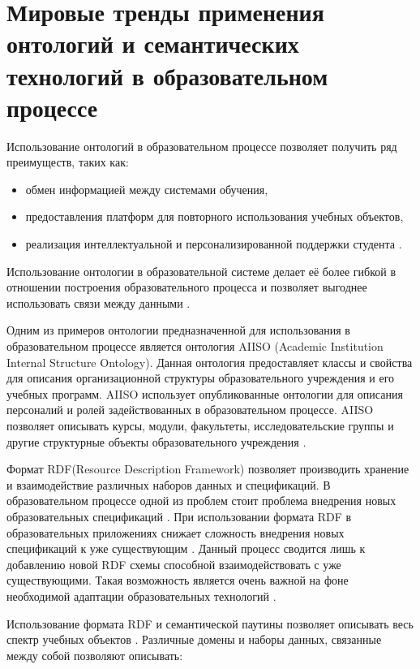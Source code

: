 \section{Мировые тренды применения онтологий и семантических технологий в образовательном процессе} \label{sect1_6}

Использование онтологий в образовательном процессе позволяет получить ряд преимуществ, таких как:
\begin{itemize}
\item обмен информацией между системами обучения, 
\item предоставления платформ для повторного использования учебных объектов,
\item реализация интеллектуальной и персонализированной поддержки студента \cite{gaeta2011ontology}.
\end{itemize}

Использование онтологии в образовательной системе делает её более гибкой в отношении построения образовательного процесса и позволяет выгоднее использовать связи между данными \cite{wilson2004role}.

Одним из примеров онтологии предназначенной для использования в образовательном процессе является онтология AIISO (Academic Institution Internal Structure Ontology). Данная онтология предоставляет классы и свойства для описания организационной структуры образовательного учреждения и его учебных программ. AIISO использует опубликованные онтологии для описания персоналий и ролей задействованных в образовательном процессе. AIISO позволяет описывать курсы, модули, факультеты, исследовательские группы и другие структурные объекты образовательного учреждения \cite{styles2008academic}. 

Формат RDF(Resource Description Framework) позволяет производить хранение и взаимодействие различных наборов данных и спецификаций. В образовательном процессе одной из проблем стоит проблема внедрения новых образовательных спецификаций \cite{henze2004reasoning}. При использовании формата RDF в образовательных приложениях снижает сложность внедрения новых спецификаций к уже существующим \cite{moller2010learning}. Данный процесс сводится лишь к добавлению новой RDF схемы способной взаимодействовать с уже существующими. Такая возможность является очень важной на фоне необходимой адаптации образовательных технологий \cite{nilsson2001semantic}. 

Использование формата RDF и семантической паутины позволяет описывать весь спектр учебных объектов \cite{bouzeghoub2004rdf}. Различные домены и наборы данных, связанные между собой позволяют описывать:

